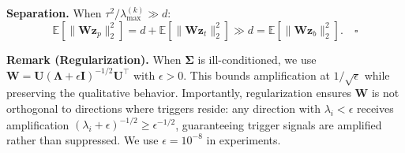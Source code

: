 \documentclass[letterpaper,twocolumn,10pt]{article}
\begin{document}
\par \textbf{Separation.} When $\tau^2/\lambda_{\max}^{(k)} \gg d$:
\begin{equation}
\mathbb{E}[\|\mathbf{W}\mathbf{z}_p\|_2^2] = d + \mathbb{E}[\|\mathbf{W}\mathbf{z}_t\|_2^2] \gg d = \mathbb{E}[\|\mathbf{W}\mathbf{z}_b\|_2^2]. \quad \square
\end{equation}

\par \textbf{Remark (Regularization).} When $\bm{\Sigma}$ is ill-conditioned, we use $\mathbf{W} = \mathbf{U}(\bm{\Lambda} + \epsilon \mathbf{I})^{-1/2}\mathbf{U}^\top$ with $\epsilon > 0$. This bounds amplification at $1/\sqrt{\epsilon}$ while preserving the qualitative behavior. Importantly, regularization ensures $\mathbf{W}$ is not orthogonal to directions where triggers reside: any direction with $\lambda_i < \epsilon$ receives amplification $(\lambda_i + \epsilon)^{-1/2} \geq \epsilon^{-1/2}$, guaranteeing trigger signals are amplified rather than suppressed. We use $\epsilon = 10^{-8}$ in experiments.

 

\end{document}
